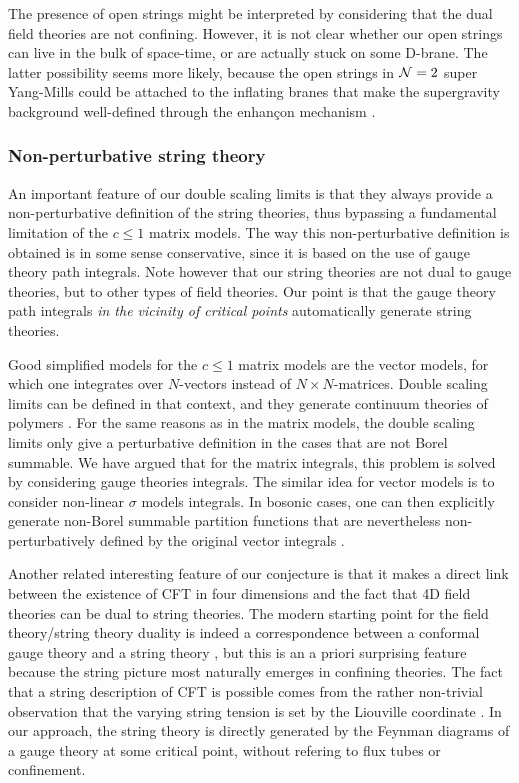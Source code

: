 \documentclass[a4paper,12pt]{article}
\begin{document}
{The presence of open strings might be interpreted by considering that the 
dual field theories are not confining. However, it is not clear whether our 
open strings can live in the bulk of space-time, or are actually stuck 
on some D-brane. The latter possibility seems more likely, because the 
open strings in ${\cal N}=2$ super Yang-Mills \cite{fer} could be
attached to the inflating branes that make the supergravity 
background well-defined through the enhan\c con mechanism \cite{pol}.
%
\subsubsection{Non-perturbative string theory}
%
An important feature of our double scaling limits is that they always 
provide a non-perturbative definition of the string theories, thus 
bypassing a fundamental limitation of the $c\leq 1$ matrix models. The way 
this non-perturbative definition is obtained is in some sense 
conservative, since it is based on the use of gauge theory path integrals. 
Note however that our string theories are not dual to gauge theories, but 
to other types of field theories. Our point is that
the gauge theory path integrals {\it in the vicinity of critical points}
automatically generate string theories.

Good simplified models for 
the $c\leq 1$ matrix models are the vector models, for which one 
integrates 
over $N$-vectors instead of $N\times N$-matrices. Double scaling limits 
can be defined in that context, and they generate
continuum theories of polymers \cite{polym,ZJM}. 
For the same reasons as in the matrix models, the double scaling limits 
only give a perturbative definition in the cases that are not Borel summable.
We have argued that for the matrix integrals, this problem is
solved by considering gauge theories integrals. The similar idea for
vector models is to consider non-linear $\sigma$ models integrals.
In bosonic cases, 
one can then explicitly generate non-Borel summable partition functions 
that are nevertheless non-perturbatively defined by the original vector 
integrals \cite{fer4}.

Another related interesting feature of our conjecture is that 
it makes a direct link between the existence of CFT in four dimensions
and the fact that 4D field theories can be dual to string theories.
The modern starting point for the field theory/string theory duality is 
indeed a correspondence between a conformal gauge theory and a string 
theory \cite{malda}, 
but this is an a priori surprising feature because the string 
picture most naturally emerges in confining theories. The fact that a 
string description of CFT is possible comes from the rather non-trivial 
observation that the varying
string tension is set by the Liouville coordinate \cite{wall}. In our 
approach, the string theory is directly generated by the Feynman diagrams 
of a gauge theory at some critical point, without refering to flux 
tubes or confinement. 

}
\end{document}

